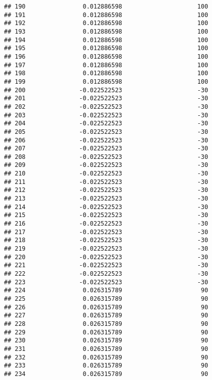 \documentclass[]{article}
\begin{document}
\begin{verbatim}
## 190                0.012886598                     100
## 191                0.012886598                     100
## 192                0.012886598                     100
## 193                0.012886598                     100
## 194                0.012886598                     100
## 195                0.012886598                     100
## 196                0.012886598                     100
## 197                0.012886598                     100
## 198                0.012886598                     100
## 199                0.012886598                     100
## 200               -0.022522523                     -30
## 201               -0.022522523                     -30
## 202               -0.022522523                     -30
## 203               -0.022522523                     -30
## 204               -0.022522523                     -30
## 205               -0.022522523                     -30
## 206               -0.022522523                     -30
## 207               -0.022522523                     -30
## 208               -0.022522523                     -30
## 209               -0.022522523                     -30
## 210               -0.022522523                     -30
## 211               -0.022522523                     -30
## 212               -0.022522523                     -30
## 213               -0.022522523                     -30
## 214               -0.022522523                     -30
## 215               -0.022522523                     -30
## 216               -0.022522523                     -30
## 217               -0.022522523                     -30
## 218               -0.022522523                     -30
## 219               -0.022522523                     -30
## 220               -0.022522523                     -30
## 221               -0.022522523                     -30
## 222               -0.022522523                     -30
## 223               -0.022522523                     -30
## 224                0.026315789                      90
## 225                0.026315789                      90
## 226                0.026315789                      90
## 227                0.026315789                      90
## 228                0.026315789                      90
## 229                0.026315789                      90
## 230                0.026315789                      90
## 231                0.026315789                      90
## 232                0.026315789                      90
## 233                0.026315789                      90
## 234                0.026315789                      90

\end{verbatim}
\end{document}
